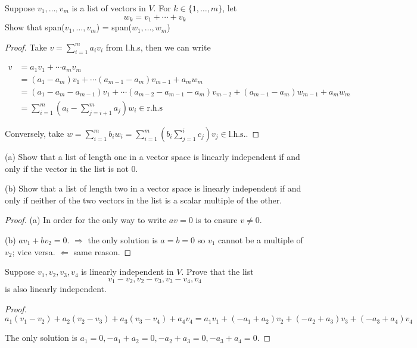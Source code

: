 \documentclass{extarticle}
\begin{document}
\begin{problem}{3}
    Suppose \(v_1, \ldots, v_m\) is a list of vectors in \(V\). 
    For \(k \in \{1, \ldots, m\}\), let 
    \[w_k = v_1 + \cdots + v_k\]
    Show that span(\(v_1, \ldots, v_m\)) = span(\(w_1, \ldots, w_m\))
\end{problem}

\begin{proof}
Take \(v = \sum_{i=1}^m a_i v_i\) from l.h.s, then we can write 

\begin{align*}
    v 
    &= a_1 v_1 + \cdots a_m v_m \\ 
    &= (a_1 - a_m) v_1 +\cdots (a_{m-1} - a_{m}) v_{m-1} + a_m w_m \\ 
    &= (a_1 - a_m - a_{m-1}) v_1 + \cdots (a_{m - 2} - a_{m-1} - a_m) v_{m-2}
    +(a_{m-1} - a_m) w_{m-1}  + a_m w_m \\ 
    &= \sum_{i=1}^m \left(a_i - \sum_{j=i+1}^m a_j \right)w_i \in \text{r.h.s}
\end{align*}

Conversely, take \(w = \sum_{i=1}^m b_i w_i = \sum_{i=1}^m (b_i \sum_{j=1}^i c_j) v_j \in \text{l.h.s.}\).
\end{proof}

\begin{problem}{4}
    (a) Show that a list of length one in a vector space is linearly independent 
    if and only if the vector in the list is not 0. 
    
    (b) Show that a list of length two in a vector space is linearly independent 
    if and only if neither of the two vectors in the list is a scalar multiple of 
    the other.
\end{problem}

\begin{proof}
(a) In order for the only way to write \(a v = 0\) is to ensure \(v \neq 0\). 

(b) \(a v_1 + b v_2 = 0\). \(\Rightarrow\) the only solution is \(a=b=0\) so \(v_1\)
cannot be a multiple of \(v_2\); vice versa.  \(\Leftarrow\) same reason.
\end{proof}

\begin{problem}{8}
    Suppose \(v_1, v_2, v_3, v_4\) is linearly independent in \(V\). Prove that the list 
    \[v_1 - v_2, v_2 - v_3, v_3 - v_4 , v_4\]
    is also linearly independent. 
\end{problem}

\begin{proof}
    \[a_1(v_1 - v_2) + a_2 (v_2 - v_3) + a_3 (v_3 - v_4) + a_4 v_4 = a_1v_1 
    + (-a_1 + a_2)v_2 + (-a_2 + a_3)v_3 + (-a_3 + a_4) v_4\]

    The only solution is \(a_1 = 0, -a_1 + a_2 = 0, -a_2 + a_3 = 0, -a_3 + a_4 = 0\).
\end{proof}
\end{document}
